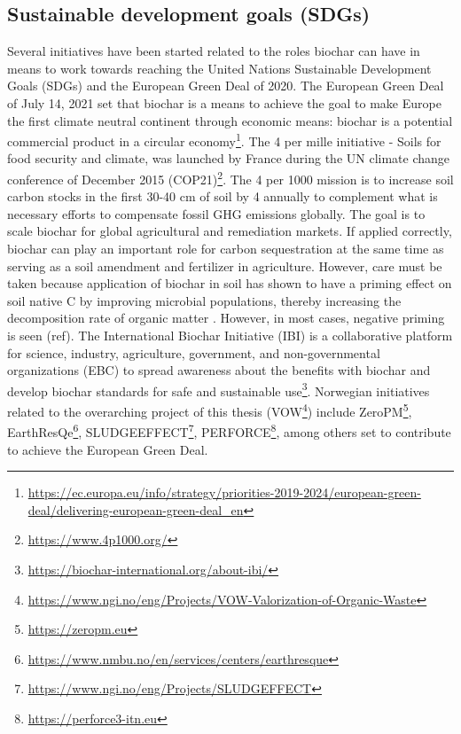 \subsection{Sustainable development goals (SDGs) \label{sec:SDGs}}
Several initiatives have been started related to the roles biochar can have in means to work towards reaching the United Nations Sustainable Development Goals (\acrshort{SDGs}) \citep{SDGs2015} and the European Green Deal of 2020. The European Green Deal of July 14, 2021 set that biochar is a means to achieve the goal to make Europe the first climate neutral continent through economic means: biochar is a potential commercial product in a circular economy\footnote{\url{https://ec.europa.eu/info/strategy/priorities-2019-2024/european-green-deal/delivering-european-green-deal_en}}. The 4 per mille initiative - Soils for food security and climate, was launched by France during the UN climate change conference of December 2015 (COP21)\footnote{\url{https://www.4p1000.org/}}. The 4 per 1000 mission is to increase soil carbon stocks in the first 30-40 cm of soil by 4 \textperthousand  annually to complement what is necessary efforts to compensate fossil GHG emissions globally. The goal is to scale biochar for global agricultural and remediation markets. If applied correctly, biochar can play an important role for carbon sequestration at the same time as serving as a soil amendment and fertilizer in agriculture. However, care must be taken because application of biochar in soil has shown to have a priming effect on soil native C by improving microbial populations, thereby increasing the decomposition rate of organic matter \citep{Ahmad2014}. However, in most cases, negative priming is seen (ref). The International Biochar Initiative (IBI) is a collaborative platform for science, industry, agriculture, government, and non-governmental organizations (EBC) to spread awareness about the benefits with biochar and develop biochar standards for safe and sustainable use\footnote{\url{https://biochar-international.org/about-ibi/}}. Norwegian initiatives related to the overarching project of this thesis (VOW\footnote{\url{https://www.ngi.no/eng/Projects/VOW-Valorization-of-Organic-Waste}}) include ZeroPM\footnote{\url{https://zeropm.eu}}, EarthResQe\footnote{\url{https://www.nmbu.no/en/services/centers/earthresque}}, SLUDGEEFFECT\footnote{\url{https://www.ngi.no/eng/Projects/SLUDGEFFECT}}, PERFORCE\footnote{\url{https://perforce3-itn.eu}}, among others set to contribute to achieve the European Green Deal. 

